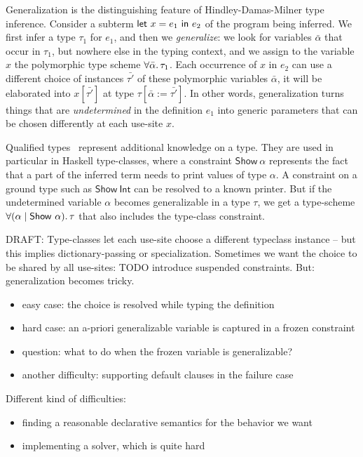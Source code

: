 \documentclass[acmsmall,screen,nonacm]{acmart}
\begin{document}
Generalization is the distinguishing feature of Hindley-Damas-Milner type
inference. Consider a subterm $\mathsf{let} ~ x = e_1 ~ \mathsf{in} ~ e_2$ of the program being
inferred. We first infer a type $\tau_1$ for $e_1$, and then we
\emph{generalize}: we look for variables $\bar{\alpha}$ that occur in
$\tau_1$, but nowhere else in the typing context, and we assign to the
variable $x$ the polymorphic type scheme $\forall {\bar{\alpha}}.\,{\tau_1}$. Each
occurrence of $x$ in $e_2$ can use a different choice of instances
$\bar{\tau'}$ of these polymorphic variables $\bar{\alpha}$, it will be
elaborated into $x [\bar{\tau'}]$ at type $\tau[\bar{\alpha} :=
\bar{\tau'}]$. In other words, generalization turns things that are
\emph{undetermined} in the definition $e_1$ into generic parameters that can
be chosen differently at each use-site $x$.

Qualified types~\citep*{TODO} represent additional knowledge on a type. They
are used in particular in Haskell type-classes, where a constraint
$\mathsf{Show}~\alpha$ represents the fact that a part of the inferred term
needs to print values of type $\alpha$. A constraint on a ground type such
as $\mathsf{Show}~\mathsf{Int}$ can be resolved to a known printer. But if
the undetermined variable $\alpha$ becomes generalizable in a type $\tau$,
we get a type-scheme $\forall {(\alpha \mid \mathsf{Show}~\alpha)}.\,{\tau}$ that
also includes the type-class constraint.

DRAFT: Type-classes let each use-site choose a different typeclass instance
-- but this implies dictionary-passing or specialization. Sometimes we want
the choice to be shared by all use-sites: TODO introduce suspended
constraints. But: generalization becomes tricky.
\begin{itemize}
\item easy case: the choice is resolved while typing the definition
\item hard case: an a-priori generalizable variable is captured in a frozen
   constraint 
\item question: what to do when the frozen variable is generalizable?
\item another difficulty: supporting default clauses in the failure case
\end{itemize}

Different kind of difficulties:
\begin{itemize}
\item finding a reasonable declarative semantics for the behavior we want
\item implementing a solver, which is quite hard
\end{itemize}
\end{document}
